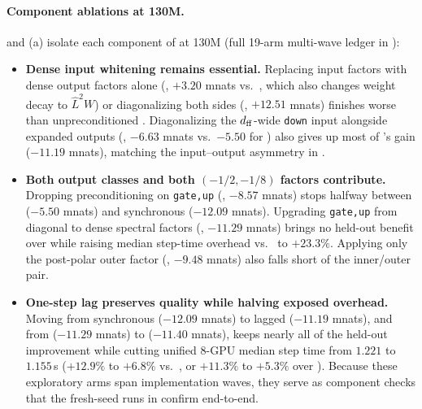 \paragraph{Component ablations at 130M.}
 and (a) isolate each component of  at 130M (full 19-arm multi-wave ledger in ):
\begin{itemize}
 \item \textbf{Dense input whitening remains essential.} Replacing input factors with dense output factors alone (, $+3.20$ mnats vs.\ , which also changes weight decay to $\hat L^2 W$) or diagonalizing both sides (, $+12.51$ mnats) finishes worse than unpreconditioned . Diagonalizing the $d_{\mathrm{ff}}$-wide \texttt{down} input alongside expanded outputs (, $-6.63$ mnats vs.\ $-5.50$ for ) also gives up most of 's gain ($-11.19$ mnats), matching the input--output asymmetry in .
 \item \textbf{Both output classes and both $(-1/2,-1/8)$ factors contribute.} Dropping preconditioning on \texttt{gate,up} (, $-8.57$ mnats) stops halfway between  ($-5.50$ mnats) and synchronous  ($-12.09$ mnats). Upgrading \texttt{gate,up} from diagonal to dense spectral factors (, $-11.29$ mnats) brings no held-out benefit over  while raising median step-time overhead vs.\  to $+23.3\%$. Applying only the post-polar outer factor (, $-9.48$ mnats) also falls short of the inner/outer pair.
 \item \textbf{One-step lag preserves quality while halving exposed overhead.} Moving from synchronous  ($-12.09$ mnats) to lagged  ($-11.19$ mnats), and from  ($-11.29$ mnats) to  ($-11.40$ mnats), keeps nearly all of the held-out improvement while cutting unified 8-GPU median step time from $1.221$ to $1.155$\,s ($+12.9\%$ to $+6.8\%$ vs.\ , or $+11.3\%$ to $+5.3\%$ over ). Because these exploratory arms span implementation waves, they serve as component checks that the fresh-seed runs in  confirm end-to-end.
\end{itemize}



